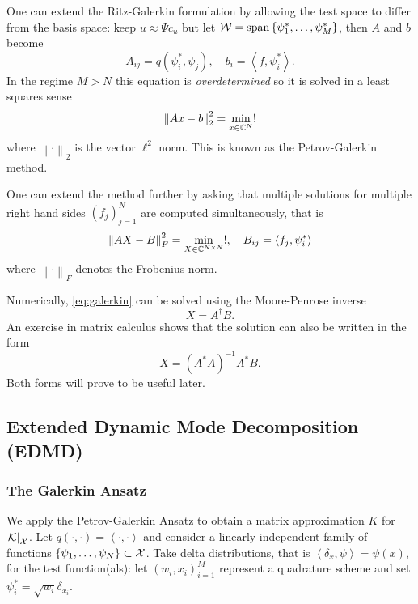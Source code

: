 One can extend the Ritz-Galerkin formulation by allowing the test space to differ from 
the basis space: keep $u \approx \Psi c_u$ but let 
$\mathcal{W} = \text{span} \left\{ \psi^*_1, \ldots, \psi^*_M \right\}$, then $A$ and $b$ become 
\begin{equation}
    A_{i j} = q( \psi^*_i, \psi_j ), \quad 
    b_i = \left\langle f, \psi^*_i \right\rangle . 
\end{equation}
In the regime $M > N$ this equation is \emph{overdetermined} so it is solved in a least 
squares sense
\begin{equation}
    \left\| A x - b \right\|_2^2 = \min_{x \in \mathbb{C}^N} !
\end{equation}
where $\left\| \cdot \right\|_2$ is the vector $\ell^2$ norm. This is known as the 
Petrov-Galerkin method. 

One can extend the method further by asking that multiple solutions for multiple right 
hand sides $(f_j)_{j=1}^N$ are computed simultaneously, that is 
\begin{equation}
    \label{eq:galerkin}
    \left\| A X - B \right\|_F^2 = \min_{X \in \mathbb{C}^{N \times N}} !, \quad 
    B_{i j} = \left\langle f_j, \psi^*_i \right\rangle 
\end{equation}
where $\left\| \cdot \right\|_F$ denotes the Frobenius norm. 

Numerically, \ref{eq:galerkin} can be solved using the Moore-Penrose inverse
\begin{equation}
    \label{eq:moore_penrose}
    X = A^\dagger B . 
\end{equation}
An exercise in matrix calculus shows that the solution can also be written in the form 
\begin{equation}
    \label{eq:adjoint_inverse}
    X = (A^* A)^{-1} A^* B . 
\end{equation}
Both forms will prove to be useful later. 


\subsection{Extended Dynamic Mode Decomposition (EDMD)}

\subsubsection{The Galerkin Ansatz}

We apply the Petrov-Galerkin Ansatz to obtain a matrix approximation $K$ 
for $\left. \mathcal{K} \right|_{\mathcal{X}}$. Let 
$q(\cdot, \cdot) = \left\langle \cdot, \cdot \right\rangle$ and consider a linearly 
independent family of functions $\left\{ \psi_1, \ldots, \psi_N \right\} \subset \mathcal{X}$. 
Take delta distributions, that is $\left\langle \delta_x, \psi \right\rangle = \psi (x)$, 
for the test function(als): let $(w_i, x_i)_{i=1}^M$ represent a quadrature scheme and 
set $\psi_i^* = \sqrt{w_i} \delta_{x_i}$. 

